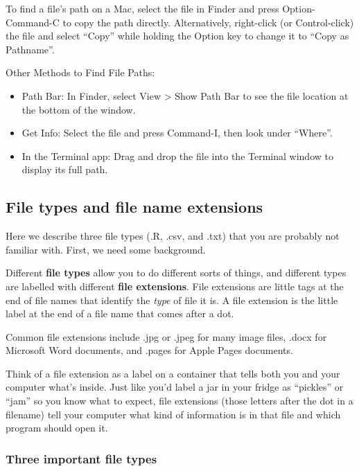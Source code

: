 \documentclass[
  letterpaper,
  DIV=11,
  numbers=noendperiod]{scrreprt}
\providecommand{\tightlist}{%
  \setlength{\itemsep}{0pt}\setlength{\parskip}{0pt}}
\begin{document}
To find a file's path on a Mac, select the file in Finder and press
Option-Command-C to copy the path directly. Alternatively, right-click
(or Control-click) the file and select ``Copy'' while holding the Option
key to change it to ``Copy as Pathname''.

Other Methods to Find File Paths:

\begin{itemize}
\tightlist
\item
  Path Bar: In Finder, select View \textgreater{} Show Path Bar to see
  the file location at the bottom of the window.
\item
  Get Info: Select the file and press Command-I, then look under
  ``Where''.
\item
  In the Terminal app: Drag and drop the file into the Terminal window
  to display its full path.
\end{itemize}

\subsection{File types and file name
extensions}\label{file-types-and-file-name-extensions}

Here we describe three file types (.R, .csv, and .txt) that you are
probably not familiar with. First, we need some background.

Different \textbf{file types} allow you to do different sorts of things,
and different types are labelled with different \textbf{file
extensions}. File extensions are little tags at the end of file names
that identify the \emph{type} of file it is. A file extension is the
little label at the end of a file name that comes after a dot.

Common file extensions include .jpg or .jpeg for many image files, .docx
for Microsoft Word documents, and .pages for Apple Pages documents.

Think of a file extension as a label on a container that tells both you
and your computer what's inside. Just like you'd label a jar in your
fridge as ``pickles'' or ``jam'' so you know what to expect, file
extensions (those letters after the dot in a filename) tell your
computer what kind of information is in that file and which program
should open it.

\subsubsection{Three important file
types}\label{three-important-file-types}
\end{document}
